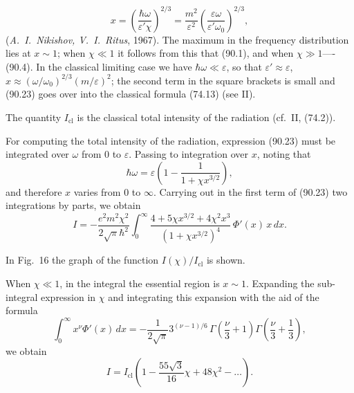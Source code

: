 \begin{equation}
x = \left(\frac{\hbar\omega}{\varepsilon'\chi}\right)^{\!2/3} = \frac{m^2}{\varepsilon^2}\left(\frac{\varepsilon\omega}{\varepsilon'\omega_0}\right)^{\!2/3},
\label{eq:90.24}
\end{equation}
(\emph{A.~I.~Nikishov, V.~I.~Ritus}, 1967). The maximum in the frequency distribution lies at $x \sim 1$; when $\chi \ll 1$ it follows from this that (90.1), and when $\chi \gg 1$----(90.4). In the classical limiting case we have $\hbar\omega \ll \varepsilon$, so that $\varepsilon' \approx \varepsilon$, $x \approx (\omega/\omega_0)^{2/3}(m/\varepsilon)^2$; the second term in the square brackets is small and (90.23) goes over into the classical formula (74.13) (see II).



The quantity $I_\text{cl}$ is the classical total intensity of the radiation (cf.\ II, (74.2)).

For computing the total intensity of the radiation, expression (90.23) must be integrated over $\omega$ from 0 to $\varepsilon$. Passing to integration over $x$, noting that
\[
\hbar\omega = \varepsilon\left(1 - \frac{1}{1 + \chi x^{3/2}}\right),
\]
and therefore $x$ varies from 0 to $\infty$. Carrying out in the first term of (90.23) two integrations by parts, we obtain
\begin{equation}
I = -\frac{e^2m^2\chi^2}{2\sqrt{\pi}\hbar^2}\int_0^\infty \frac{4 + 5\chi x^{3/2} + 4\chi^2 x^3}{(1+\chi x^{3/2})^4}\,\Phi'(x)\,x\,dx.
\label{eq:90.25}
\end{equation}

In Fig.~16 the graph of the function $I(\chi)/I_\text{cl}$ is shown.

When $\chi \ll 1$, in the integral the essential region is $x \sim 1$. Expanding the sub-integral expression in $\chi$ and integrating this expansion with the aid of the formula
\[
\int_0^\infty x^\nu \Phi'(x)\,dx = -\frac{1}{2\sqrt{\pi}}3^{(\nu-1)/6}\,\Gamma\!\left(\frac{\nu}{3}+1\right)\Gamma\!\left(\frac{\nu}{3}+\frac{1}{3}\right),
\]
we obtain
\begin{equation}
I = I_\text{cl}\left(1 - \frac{55\sqrt{3}}{16}\chi + 48\chi^2 - \ldots\right).
\label{eq:90.26}
\end{equation}

